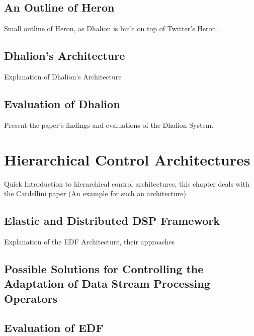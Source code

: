 \subsection{An Outline of Heron}
Small outline of Heron, as Dhalion is built on top of Twitter's Heron.
\subsection{Dhalion's Architecture}
Explanation of Dhalion's Architecture
\subsection{Evaluation of Dhalion}
Present the paper's findings and evaluations of the Dhalion System.

\section{Hierarchical Control Architectures}
Quick Introduction to hierarchical control architectures, this chapter deals with the Cardellini
paper (An example for such an architecture)
\subsection{Elastic and Distributed DSP Framework}
Explanation of the EDF Architecture, their approaches
\subsection{Possible Solutions for Controlling the Adaptation of Data Stream Processing Operators}

\subsection{Evaluation of EDF}
